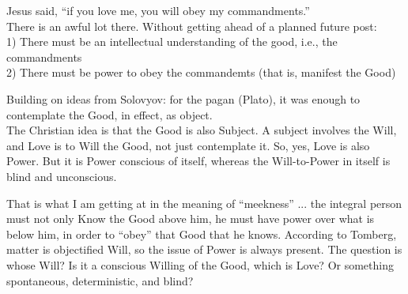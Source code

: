 \begin{footnotesize}
\begin{sffamily}
Jesus said, ``if you love me, you will obey my commandments.''\\ There is an awful lot there. Without getting ahead of a planned future post:\\ 1) There must be an intellectual understanding of the good, i.e., the commandments\\ 2) There must be power to obey the commandemts (that is, manifest the Good)

Building on ideas from Solovyov: for the pagan (Plato), it was enough to contemplate the Good, in effect, as object.\\ The Christian idea is that the Good is also Subject. A subject involves the Will, and Love is to Will the Good, not just contemplate it. So, yes, Love is also Power. But it is Power conscious of itself, whereas the Will-to-Power in itself is blind and unconscious.

That is what I am getting at in the meaning of ``meekness'' ... the integral person must not only Know the Good above him, he must have power over what is below him, in order to ``obey'' that Good that he knows. According to Tomberg, matter is objectified Will, so the issue of Power is always present. The question is whose Will? Is it a conscious Willing of the Good, which is Love? Or something spontaneous, deterministic, and blind?

\end{sffamily}
\end{footnotesize}

